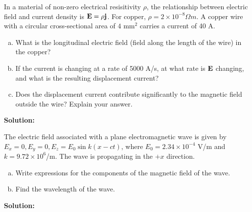 \documentclass[11pt]{article}
\newcommand{\be}{\begin{enumerate}[a) ]}
\newcommand{\ee}{\end{enumerate}}
\begin{document}
\vspace*{0.25in}


\begin{problem}
In a material of non-zero electrical resisitivity $\rho$, the relationship between electric field and current
density is $\mathbf{E} = \rho\mathbf{j}$. For copper, $\rho = 2 \times 10^{-8} \Omega m$. A copper wire with a circular cross-sectional area
of $4 \text{ mm}^2$ carries a current of 40 A.
\be
\item What is the longitudinal electric field (field along the length of the wire) in the copper?
\item If the current is changing at a rate of 5000 A/s, at what rate is $\mathbf{E}$ changing, and what is the
resulting displacement current?
\item Does the displacement current contribute significantly to the magnetic field outside the wire?
Explain your answer.
\ee
\end{problem}


\textbf{Solution:}\\

\clearpage

\begin{problem}[(E38.16)*]
The electric field associated with a plane electromagnetic wave is given by $E_x = 0, E_y = 0,
E_z = E_0 \sin k(x-ct)$, where $E_0 = 2.34 \times 10^{-4}$ V/m and $k = 9.72 \times 10^6$/m. The wave is propagating
in the $+x$ direction.
\be
\item Write expressions for the components of the magnetic field of the wave.
\item Find the wavelength of the wave.
\ee
\end{problem}


\textbf{Solution:}\\

\clearpage
\end{document}
